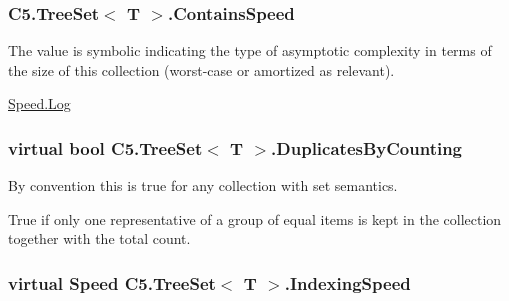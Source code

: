 \subsubsection[{Contains\+Speed}]{ {\bf C5.\+Tree\+Set}$<$ T $>$.Contains\+Speed\hspace{0.3cm}{\ttfamily [get]}}\label{class_c5_1_1_tree_set_a124c0cee22a8f1ae363e9d37a9e5fc0f}


The value is symbolic indicating the type of asymptotic complexity in terms of the size of this collection (worst-\/case or amortized as relevant). 

\hyperlink{namespace_c5_a615ba88dcdaa8d5a3c5f833a73d7fad6ace0be71e33226e4c1db2bcea5959f16b}{Speed.\+Log}\hypertarget{class_c5_1_1_tree_set_a6dac74cd43551ac2462fed3bff68f302}{}
\subsubsection[{Duplicates\+By\+Counting}]{\setlength{\rightskip}{0pt plus 5cm}virtual bool {\bf C5.\+Tree\+Set}$<$ T $>$.Duplicates\+By\+Counting\hspace{0.3cm}{\ttfamily [get]}}\label{class_c5_1_1_tree_set_a6dac74cd43551ac2462fed3bff68f302}


By convention this is true for any collection with set semantics. 

True if only one representative of a group of equal items is kept in the collection together with the total count.\hypertarget{class_c5_1_1_tree_set_aba57c5ba1783858941dbd3f3fd14abba}{}
\subsubsection[{Indexing\+Speed}]{\setlength{\rightskip}{0pt plus 5cm}virtual {\bf Speed} {\bf C5.\+Tree\+Set}$<$ T $>$.Indexing\+Speed\hspace{0.3cm}{\ttfamily [get]}}\label{class_c5_1_1_tree_set_aba57c5ba1783858941dbd3f3fd14abba}




\hypertarget{class_c5_1_1_tree_set_aebb5b753eabbe0bae5a02e7d3559b4c9}{}
